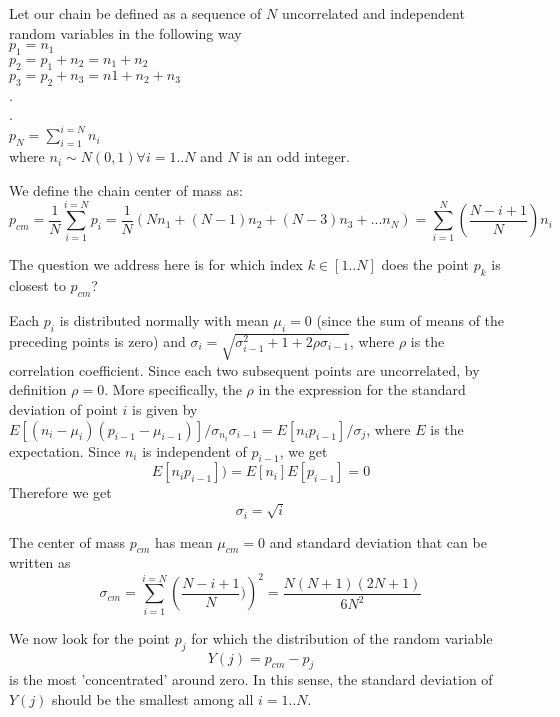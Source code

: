 \documentclass{paper}
\begin{document}
Let our chain be defined as a sequence of $N$ uncorrelated and independent random variables in the following way\\
$p_1 = n_1$\\
$p_2 = p_1+n_2=n_1+n_2$\\
$p_3 = p_2+n_3=n1+n_2+n_3$\\
.\\
.\\
$p_N = \sum_{i=1}^{i=N}n_i$\\
where $n_i\sim N(0,1)\forall i=1..N$ and $N$ is an odd integer.

We define the chain center of mass as:
\begin{equation*}
p_{cm}=\frac{1}{N}\sum_{i=1}^{i=N}p_i = \frac{1}{N}(Nn_1+(N-1)n_2+(N-3)n_3+...n_N)=\sum_{i=1}^{N}(\frac{N-i+1}{N})n_i
\end{equation*}

The question we address here is for which index $k\in[1..N]$ does the point $p_k$ is closest to $p_{cm}$?

Each $p_i$ is distributed normally with mean $\mu_i =0$ (since the sum of means of the preceding points is zero) and $\sigma_i=\sqrt{\sigma_{i-1}^2+1+2\rho\sigma_{i-1}}$, where $\rho$ is the correlation coefficient. Since each two subsequent points are uncorrelated, by definition $\rho=0$. More specifically, the $\rho$ in the expression for the standard deviation of point $i$ is given by $E[(n_i-\mu_i)(p_{i-1}-\mu_{i-1})]/\sigma_{n_i}\sigma_{i-1}=E[n_ip_{i-1}]/\sigma_j$, where $E$ is the expectation. Since $n_i$ is independent of $p_{i-1}$, we get
\begin{equation*}
E[n_ip_{i-1}])=E[n_i]E[p_{i-1}]=0
\end{equation*}
Therefore we get 
\begin{equation*}
\sigma_i=\sqrt{i}
\end{equation*}

The center of mass $p_{cm}$ has mean $\mu_{cm}=0$ and standard deviation that can be written as
\begin{equation*}
\sigma_{cm}=\sum_{i=1}^{i=N}\left( \frac{N-i+1}{N}) \right)^2 = \frac{N(N+1)(2N+1)}{6N^2}
\end{equation*}

We now look for the point $p_j$ for which the distribution of the random variable 
\begin{equation*}
Y(j)=p_{cm}-p_j
\end{equation*}
is the most 'concentrated' around zero. 
In this sense, the standard deviation of $Y(j)$ should be the smallest among all $i=1..N$.
\end{document}
